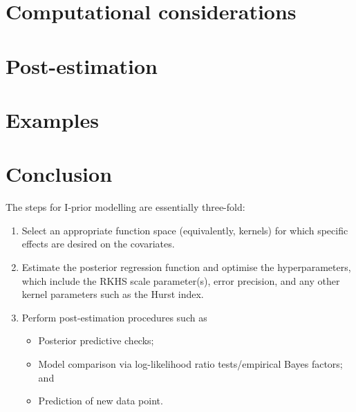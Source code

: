 \documentclass[a4paper,showframe,11pt]{report}
\begin{document}
\section{Computational considerations}\label{sec:ipriorcompcons}


\section{Post-estimation}


\section{Examples}\label{sec:ipriorexamples}


\section{Conclusion}

The steps for I-prior modelling are essentially three-fold:
\begin{enumerate}
  \item Select an appropriate function space (equivalently, kernels) for which specific effects are desired on the covariates. 
  \item Estimate the posterior regression function and optimise the hyperparameters, which include the RKHS scale parameter(s), error precision, and any other kernel parameters such as the Hurst index.
  \item Perform post-estimation procedures such as
  \begin{itemize}
    \item Posterior predictive checks;
    \item Model comparison via log-likelihood ratio tests/empirical Bayes factors; and
    \item Prediction of new data point.
  \end{itemize}
\end{enumerate}
\end{document}
